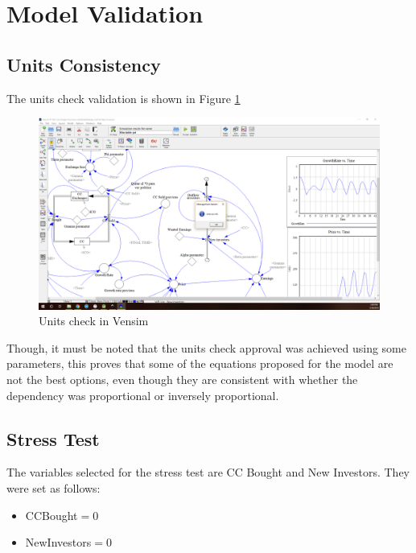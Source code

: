\section{Model Validation}
\subsection{Units Consistency}
The units check validation is shown in Figure \ref{img:units}
\begin{figure}[H]
	\centering
    \includegraphics[scale=0.3]{files/Units.png}
    \caption{Units check in Vensim}
    \label{img:units}
\end{figure}
Though, it must be noted that the units check approval was achieved using some parameters, this proves that some of the equations proposed for the model are not the best options, even though they are consistent with whether the dependency was proportional or inversely proportional. 
\subsection{Stress Test}
	The variables selected for the stress test are CC Bought and New Investors. They were set as follows:
	\begin{multicols}{2}
    \begin{itemize}
    \item CCBought$=0$
    \columnbreak 
    \item NewInvestors$=0$
    \end{itemize}
		
	\end{multicols}
	
